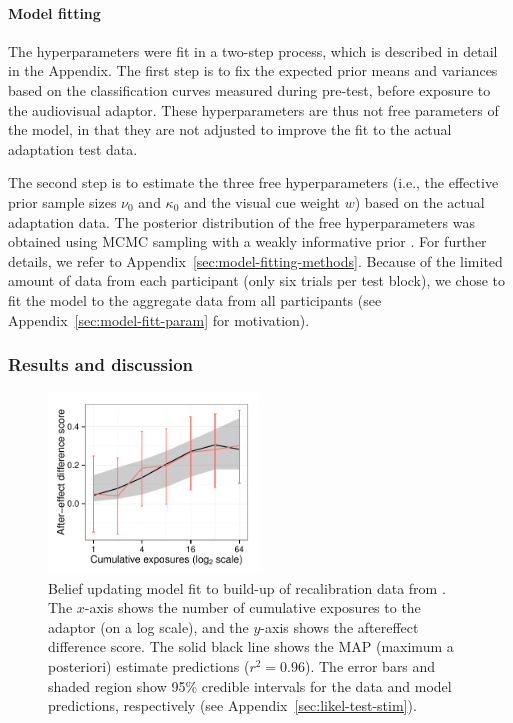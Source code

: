 \paragraph{Model fitting}
\label{sec:free-parameters}

The hyperparameters were fit in a two-step process, which is described in detail in the Appendix.  %
The first step is to fix the expected prior means and variances based on the classification curves measured during pre-test, before exposure to the audiovisual adaptor.  These hyperparameters are thus not free parameters of the model, in that they are not adjusted to improve the fit to the actual adaptation test data.

The second step is to estimate the three free hyperparameters (i.e., the effective prior sample sizes $\nu_0$ and $\kappa_0$ and the visual cue weight $w$) based on the actual adaptation data. The posterior distribution of the free hyperparameters was obtained using MCMC sampling with a weakly informative prior \autocite[to ensure a proper posterior,][]{Gelman2003}. For further details, we refer to Appendix~\ref{sec:model-fitting-methods}.
Because of the limited amount of data from each participant (only six trials per test block), we chose to fit the model to the aggregate data from all participants (see Appendix~\ref{sec:model-fitt-param} for motivation).

\subsubsection{Results and discussion}
\label{sec:results}

\begin{figure}[htb]
  \centering
  \includegraphics[width=0.5\textwidth]{figure/vroomen-recal-ae-fits-first-64.pdf}
  \caption{Belief updating model fit to build-up of recalibration data from \protect\textcite{Vroomen2007}.  The $x$-axis shows the number of cumulative exposures to the adaptor (on a log scale), and the $y$-axis shows the aftereffect difference score.  The solid black line shows the MAP (maximum a posteriori) estimate predictions ($r^2=0.96$). The error bars and shaded region show 95\% credible intervals for the data and model predictions, respectively (see Appendix~\ref{sec:likel-test-stim}). }
  \label{fig:recal-buildup-preds}
\end{figure}

